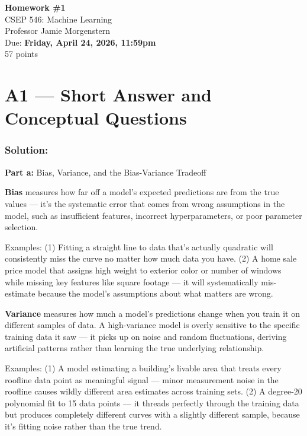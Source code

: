 \documentclass{article}
\begin{document}
\setcounter{aprob}{0}

{\centering
\Large\textbf{Homework \#1} \\[0.5em]
\normalsize CSEP 546: Machine Learning \\
Professor Jamie Morgenstern \\
Due: \textbf{Friday, April 24, 2026, 11:59pm} \\
57 points \\[1em]
}

\section*{A1 --- Short Answer and Conceptual Questions}

\subsubsection*{Solution:}

\begin{mdframed}
\textbf{\large Part a:} Bias, Variance, and the Bias-Variance Tradeoff
\end{mdframed}

\textbf{Bias} measures how far off a model's expected predictions are from the true values --- it's the systematic error that comes from wrong assumptions in the model, such as insufficient features, incorrect hyperparameters, or poor parameter selection.

Examples: (1) Fitting a straight line to data that's actually quadratic will consistently miss the curve no matter how much data you have. (2) A home sale price model that assigns high weight to exterior color or number of windows while missing key features like square footage --- it will systematically mis-estimate because the model's assumptions about what matters are wrong.

\medskip
\textbf{Variance} measures how much a model's predictions change when you train it on different samples of data. A high-variance model is overly sensitive to the specific training data it saw --- it picks up on noise and random fluctuations, deriving artificial patterns rather than learning the true underlying relationship.

Examples: (1) A model estimating a building's livable area that treats every roofline data point as meaningful signal --- minor measurement noise in the roofline causes wildly different area estimates across training sets. (2) A degree-20 polynomial fit to 15 data points --- it threads perfectly through the training data but produces completely different curves with a slightly different sample, because it's fitting noise rather than the true trend.
\end{document}
